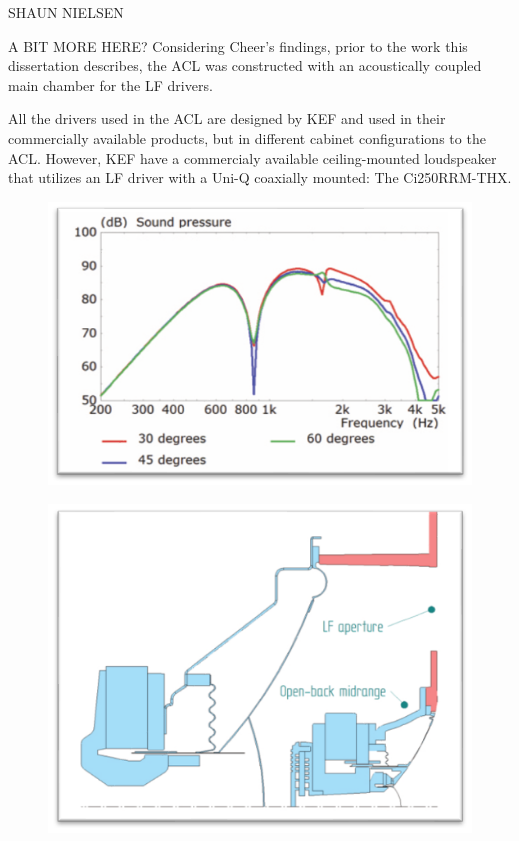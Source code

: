 \documentclass{report}
\begin{document}
        SHAUN NIELSEN

        A BIT MORE HERE?
        Considering Cheer's findings, prior to the work this dissertation describes, the ACL was constructed with an acoustically coupled main chamber for the LF drivers.

        All the drivers used in the ACL are designed by KEF and used in their commercially available products, but in different cabinet configurations to the ACL.
        However, KEF have a commercialy available ceiling-mounted loudspeaker that utilizes an LF driver with a Uni-Q coaxially mounted: The Ci250RRM-THX.
        \begin{figure}[H]
            \begin{minipage}{.49\textwidth}
                \includegraphics[width=\linewidth]{figs/KEFpressure.png}%
                \centering
                \caption{}
                \label{KEFpressure} \cite{KEFCi}
            \end{minipage}
            \begin{minipage}{.49\textwidth}
                \includegraphics[width=\linewidth]{figs/KEFdiagram.png}%
                \centering
                \caption{ } \cite{KEFCi}
                \label{KEFdiagram}
        \end{minipage}
        \end{figure}
\end{document}
